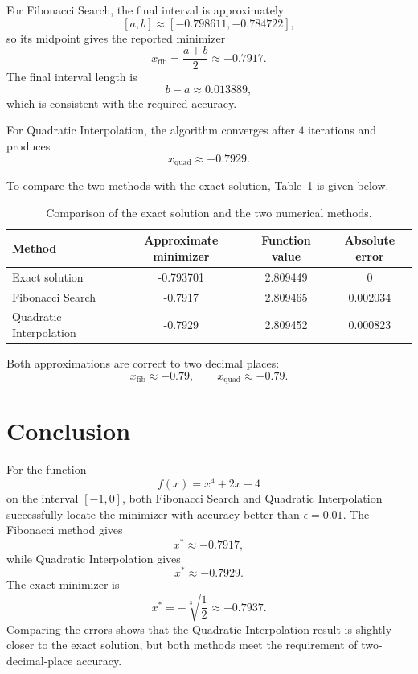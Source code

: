 \documentclass{article}
\begin{document}
For Fibonacci Search, the final interval is approximately
\[
    [a,b] \approx [-0.798611, -0.784722],
\]
so its midpoint gives the reported minimizer
\[
    x_{\text{fib}} = \frac{a+b}{2} \approx -0.7917.
\]
The final interval length is
\[
    b-a \approx 0.013889,
\]
which is consistent with the required accuracy.

For Quadratic Interpolation, the algorithm converges after $4$ iterations and produces
\[
    x_{\text{quad}} \approx -0.7929.
\]

To compare the two methods with the exact solution, Table~\ref{tab:compare} is given below.

\begin{table}[H]
    \centering
    \begin{tabular}{lccc}
        \toprule
        Method                  & Approximate minimizer & Function value & Absolute error \\
        \midrule
        Exact solution          & -0.793701             & 2.809449       & 0              \\
        Fibonacci Search        & -0.7917               & 2.809465       & 0.002034       \\
        Quadratic Interpolation & -0.7929               & 2.809452       & 0.000823       \\
        \bottomrule
    \end{tabular}
    \caption{Comparison of the exact solution and the two numerical methods.}
    \label{tab:compare}
\end{table}

Both approximations are correct to two decimal places:
\[
    x_{\text{fib}} \approx -0.79,
    \qquad
    x_{\text{quad}} \approx -0.79.
\]

\section{Conclusion}

For the function
\[
    f(x) = x^4 + 2x + 4
\]
on the interval $[-1,0]$, both Fibonacci Search and Quadratic Interpolation successfully locate the minimizer with accuracy better than $\epsilon=0.01$. The Fibonacci method gives
\[
    x^* \approx -0.7917,
\]
while Quadratic Interpolation gives
\[
    x^* \approx -0.7929.
\]
The exact minimizer is
\[
    x^* = -\sqrt[3]{\frac{1}{2}} \approx -0.7937.
\]
Comparing the errors shows that the Quadratic Interpolation result is slightly closer to the exact solution, but both methods meet the requirement of two-decimal-place accuracy.
\end{document}
